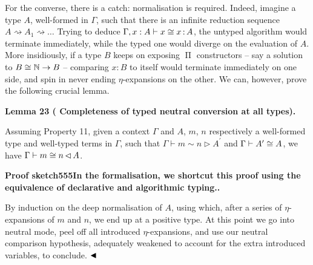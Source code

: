 \documentclass[10pt,a4paper]{amsart}
\begin{document}
For the converse, there is a catch: normalisation is required. Indeed, imagine a type $A$, well-formed in $\Gamma$, such that there is an infinite reduction sequence $A\operatorname{\rightsquigarrow}A_{1}\operatorname{\rightsquigarrow}\dots$ Trying to deduce $\Gamma,x:A\vdash x\mathrel{\raisebox{-0.5pt}{$\cong$}}x\operatorname{\mathrel{%
:}}A$, the untyped algorithm would terminate immediately, while the typed one would diverge on the evaluation of $A$. More insidiously, if a type $B$ keeps on exposing $\operatorname{\Pi}$ constructors – say a solution to $B\mathrel{\raisebox{-0.5pt}{$\cong$}}\operatorname{\mathbb{N}}\to B$ – comparing $x:B$ to itself would terminate immediately on one side, and spin in never ending $\eta$-expansions on the other. We can, however, prove the following crucial lemma.\par
 
 
 
\par\medskip\noindent\textbf{Lemma 23 (  Completeness of typed neutral conversion at all types).}\par
 
 
Assuming Property 11, given a context $\Gamma$ and $A$, $m$, $n$ respectively a well-formed type and well-typed terms in $\Gamma$, such that $\Gamma\vdash m\sim n\mathrel{\rhd}A^{\prime}$ and $\Gamma\vdash A^{\prime}\mathrel{\raisebox{-0.5pt}{$\cong$}}A$, we have $\Gamma\vdash m\mathrel{\raisebox{-0.5pt}{$\cong$}}n\operatorname{\mathrel{\lhd%
}}{A}$.\par
 
 
 
 
 
\par\medskip\noindent\textbf{Proof sketch555In the formalisation, we shortcut this proof using the equivalence of declarative and algorithmic typing..}\par
 
 
By induction on the deep normalisation of $A$, using which, after a series of $\eta$-expansions of $m$ and $n$, we end up at a positive type. At this point we go into neutral mode, peel off all introduced $\eta$-expansions, and use our neutral comparison hypothesis, adequately weakened to account for the extra introduced variables, to conclude. $\hfill\blacktriangleleft$\par
 
\end{document}
